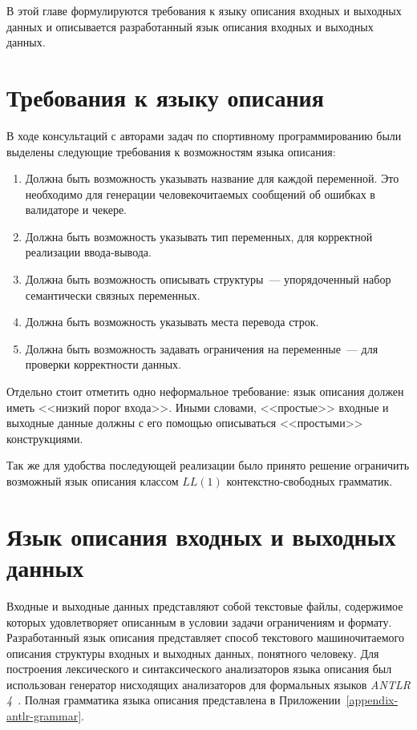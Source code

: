 \documentclass[times,specification,annotation]{style/itmo-student-thesis/itmo-student-thesis}
\begin{document}
В этой главе формулируются требования к языку описания входных и выходных данных и описывается разработанный язык описания входных и выходных данных.

\section{Требования к языку описания}

В ходе консультаций с авторами задач по спортивному программированию были выделены следующие требования к возможностям языка описания:

\begin{enumerate}
    \item Должна быть возможность указывать название для каждой переменной. Это необходимо для генерации человекочитаемых сообщений об ошибках в валидаторе и чекере.
    \item Должна быть возможность указывать тип переменных, для корректной реализации ввода-вывода.
    \item Должна быть возможность описывать структуры~--- упорядоченный набор семантически связных переменных.
    \item Должна быть возможность указывать места перевода строк.
    \item Должна быть возможность задавать ограничения на переменные~--- для проверки корректности данных.
\end{enumerate}

Отдельно стоит отметить одно неформальное требование: язык описания должен иметь <<низкий порог входа>>. Иными словами, <<простые>> входные и выходные данные должны с его помощью описываться <<простыми>> конструкциями.

Так же для удобства последующей реализации было принято решение ограничить возможный язык описания классом $LL(1)$ контекстно-свободных грамматик.

\section{Язык описания входных и выходных данных}

Входные и выходные данных представляют собой текстовые файлы, содержимое которых удовлетворяет описанным в условии задачи ограничениям и формату. Разработанный язык описания представляет способ текстового машиночитаемого описания структуры входных и выходных данных, понятного человеку. Для построения лексического и синтаксического анализаторов языка описания был использован генератор нисходящих анализаторов для формальных языков \textit{ANTLR 4}~\cite{parr2013definitive}. Полная грамматика языка описания представлена в Приложении~\ref{appendix-antlr-grammar}.
\end{document}
